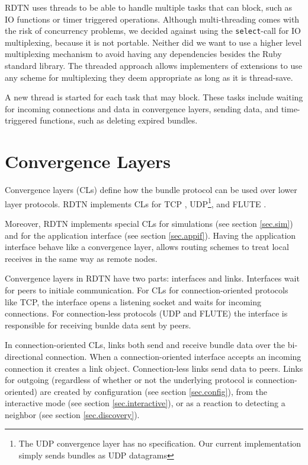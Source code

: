 \documentclass{article}
\begin{document}
RDTN uses threads to be able to handle multiple tasks that can block, such as IO
functions or timer triggered operations. Although multi-threading comes with the
risk of concurrency problems, we decided against using the {\tt select}-call for
IO multiplexing, because it is not portable. Neither did we want to use a higher
level multiplexing mechanism to avoid having any dependencies besides the Ruby
standard library. The threaded approach allows implementers of extensions to use
any scheme for multiplexing they deem appropriate as long as it is thread-save.

A new thread is started for each task that may block. These tasks include
waiting for incoming connections and data in convergence layers, sending data,
and time-triggered functions, such as deleting expired bundles.

\section{Convergence Layers}\label{sec.cl}

Convergence layers (CLs) define how the bundle protocol can be used over lower
layer protocols. RDTN implements CLs for TCP \cite{tcp-cl}, UDP\footnote{The UDP
convergence layer has no specification. Our current implementation simply sends
bundles as UDP datagrams}, and FLUTE \cite{flute-cl}.

Moreover, RDTN implements special CLs for simulations (see section
\ref{sec.sim}) and for the application interface (see section \ref{sec.appif}).
Having the application interface behave like a convergence layer, allows routing
schemes to treat local receives in the same way as remote nodes.

Convergence layers in RDTN have two parts: interfaces and links. Interfaces wait
for peers to initiale communication. For CLs for connection-oriented protocols
like TCP, the interface opens a listening socket and waits for incoming
connections. For connection-less protocols (UDP and FLUTE) the interface is
responsible for receiving bunlde data sent by peers.

In connection-oriented CLs, links both send and receive bundle data over the
bi-directional connection. When a connection-oriented interface accepts an
incoming connection it creates a link object. Connection-less links send data to
peers. Links for outgoing (regardless of whether or not the underlying protocol
is connection-oriented) are created by configuration (see section
\ref{sec.config}), from the interactive mode (see section
\ref{sec.interactive}), or as a reaction to detecting a neighbor (see section
\ref{sec.discovery}).
\end{document}
